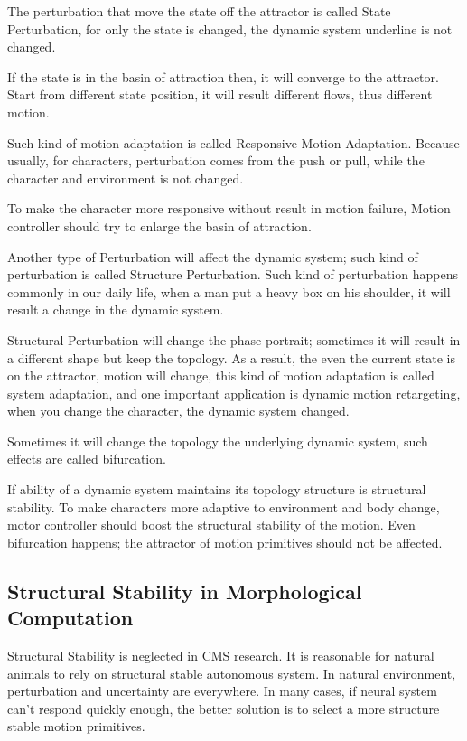 \begin{itemize}

The perturbation that move the state off the attractor is called State Perturbation, for only the state is changed, the dynamic system underline is not changed.


If the state is in the basin of attraction then, it will converge to the attractor. 
Start from different state position, it will result different flows, thus different motion.

Such kind of motion adaptation is called Responsive Motion Adaptation.
Because usually, for characters, perturbation comes from the push or pull, while the character and environment is not changed.

To make the character more responsive without result in motion failure,
Motion controller should try to enlarge the basin of attraction.







Another type of Perturbation will affect the dynamic system; such kind of perturbation is called Structure Perturbation. Such kind of perturbation happens commonly in our daily life, when a man put a heavy box on his shoulder, it will result a change in the dynamic system.

Structural Perturbation will change the phase portrait; sometimes it will result in a different shape but keep the topology. As a result, the even the current state is on the attractor, motion will change, this kind of motion adaptation is called system adaptation, and one important application is dynamic motion retargeting, when you change the character, the dynamic system changed.

Sometimes it will change the topology the underlying dynamic system, such effects are called bifurcation.

If ability of a dynamic system maintains its topology structure is structural stability.
To make characters more adaptive to environment and body change, motor controller should boost the structural stability of the motion.
Even bifurcation happens; the attractor of motion primitives should not be affected.
\end{itemize}


\subsection{Structural Stability in Morphological Computation}
Structural Stability is neglected in CMS research.
It is reasonable for natural animals to rely on structural stable autonomous system. 
In natural environment, perturbation and uncertainty are everywhere. In many cases, if neural system
can’t respond quickly enough, the better solution is to select a more structure stable motion primitives.

